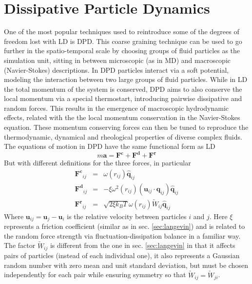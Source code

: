 \documentclass[ twoside,openright,titlepage,numbers=noenddot,%
headinclude,footinclude,cleardoublepage=empty,abstract=on,
BCOR=5mm,paper=a4,fontsize=11pt, dvipsnames
]{scrreprt}
\renewcommand{\vec}[1]{\bm{#1}}
\newcommand{\kT}{k_B T}
\newcommand{\ppos}{q}
\newcommand{\pvel}{u}
\begin{document}
\section{Dissipative Particle Dynamics}
One of the most popular techniques used to reintroduce some of the degrees of freedom lost with \gls{LD} is \gls{DPD}. This coarse graining technique can be used to go further in the spatio-temporal scale by choosing groups of fluid particles as the simulation unit, sitting in between microscopic (as in \gls{MD}) and macroscopic (Navier-Stokes) descriptions.
In \gls{DPD} particles interact via a soft potential, modeling the interaction between two large groups of fluid particles.
While in \gls{LD} the total momentum of the system is conserved, \gls{DPD} aims to also conserve the local momentum via a special thermostart, introducing pairwise dissipative and random forces. This results in the emergence of macroscopic hydrodynamic effects, related with the  the local momentum conservation in the Navier-Stokes equation. These momentum conserving forces can then be tuned to reproduce the thermodynamic, dynamical and rheological properties of diverse complex fluids.
The equations of motion in \gls{DPD} have the same functional form as \gls{LD}
\begin{equation}
  \label{eq:dpddyn}
  m\vec{a} = \vec{F^c} + \vec{F^d} + \vec{F^r}
\end{equation}
But with different definitions for the three forces, in particular
\begin{equation}
  \label{eq:dpdforces}
  \begin{aligned}
    \vec{F^c}_{ij} &=&\omega(r_{ij})\hat{\vec{\ppos}}_{ij}\\
    \vec{F^d}_{ij} &=&-\xi\omega^2(r_{ij})(\vec{\pvel}_{ij}\cdot\vec{\ppos}_{ij})\hat{\vec{\ppos}}_{ij}\\
    \vec{F^r}_{ij} &=&\sqrt{2\xi\kT}\omega(r_{ij})\widetilde{W}_{ij}\hat{\vec{\ppos}}_{ij}    
  \end{aligned}
\end{equation}
Where $\vec{\pvel}_{ij} = \vec{\pvel}_j - \vec{\pvel}_i$ is the relative velocity between particles $i$ and $j$. Here $\xi$ represents a friction coefficient (similar as in sec. \ref{sec:langevin}) and is related to the random force strength via fluctuation-dissipation balance in a familiar way\cite{Espanol1995}. The factor $\widetilde{W}_{ij}$ is different from the one in sec. \ref{sec:langevin} in that it affects pairs of particles (instead of each individual one), it also represents a Gaussian random number with zero mean and unit standard deviation, but must be chosen independently for each pair while ensuring symmetry so that $\widetilde{W}_{ij} = \widetilde{W}_{ji}$.
\end{document}
